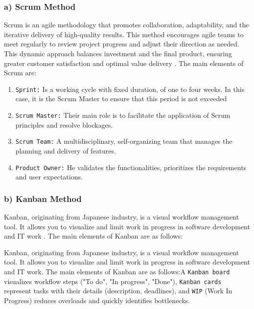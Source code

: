 \subsubsection{a) Scrum Method} 
Scrum is an agile methodology that promotes collaboration, adaptability, and the iterative delivery of high-quality results. This method encourages agile teams to meet regularly to review project progress and adjust their direction as needed. This dynamic approach balances investment and the final product, ensuring greater customer satisfaction and optimal value delivery \cite{scrum2025}.
\newpage
The main elements of Scrum are:
\begin{enumerate}{label=-}
    \item \texttt{Sprint:} Is a working cycle with fixed duration, of one to four weeks. In this case, it is the Scrum Master to ensure that this period is not exceeded \cite{schwaber2004agile}

    \item \texttt{Scrum Master:} Their main role is to facilitate the application of Scrum principles and resolve blockages.

    \item \texttt{Scrum Team:} A multidisciplinary, self-organizing team that manages the planning and delivery of features.


    \item \texttt{Product Owner:} He validates the functionalities, prioritizes the requirements and user expectations.

    
\end{enumerate}
\subsubsection{b) Kanban Method}
Kanban, originating from Japanese industry, is a visual workflow management tool. It allows you to visualize and limit work in progress in software development and IT work . The main elements of Kanban are as follows:

Kanban, originating from Japanese industry, is a visual workflow management tool. It allows you to visualize and limit work in progress in software development and IT work\cite{anderson2010kanban}. The main elements of Kanban are as follows:A \texttt{Kanban board} visualizes workflow steps ("To do", "In progress", "Done"), \texttt{Kanban cards} represent tasks with their details (description, deadlines), and \texttt{WIP} (Work In Progress) reduces overloads and quickly identifies bottlenecks.

